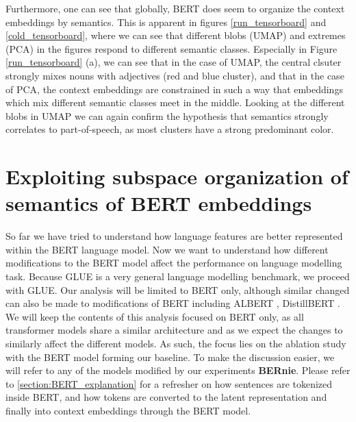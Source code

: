 \documentclass[a4paper,12pt,twoside,openright]{report}
\begin{document}
Furthermore, one can see that globally, BERT does seem to organize the context embeddings by semantics. 
This is apparent in figures \eqref{run_tensorboard} and \eqref{cold_tensorboard}, where we can see that different blobs (UMAP) and extremes (PCA) in the figures respond to different semantic classes.
Especially in Figure \eqref{run_tensorboard} (a), we can see that in the case of UMAP, the central clsuter strongly mixes nouns with adjectives (red and blue cluster), and that in the case of PCA, the context embeddings are constrained in such a way that embeddings which mix different semantic classes meet in the middle.
Looking at the different blobs in UMAP we can again confirm the hypothesis that semantics strongly correlates to part-of-speech, as most clusters have a strong predominant color.


















\chapter{Exploiting subspace organization of semantics of BERT embeddings}\label{section:ExploitingBERT}


So far we have tried to understand how language features are better represented within the BERT language model.
Now we want to understand how different modifications to the BERT model affect the performance on language modelling task.
Because GLUE is a very general language modelling benchmark, we proceed with GLUE.
Our analysis will be limited to BERT only, although similar changed can also be made to modifications of BERT including ALBERT \cite{lan20}, DistillBERT \cite{sanh19}. 
We will keep the contents of this analysis focused on BERT only, as all transformer models share a similar architecture and as we expect the changes to similarly affect the different models.
As such, the focus lies on the ablation study with the BERT model  forming our baseline.
To make the discussion easier, we will refer to any of the models modified by our experiments \textbf{BERnie}. 
Please refer to \eqref{section:BERT_explanation} for a refresher on how sentences are tokenized inside BERT, and how tokens are converted to the latent representation and finally into context embeddings through the BERT model.
\\
\end{document}
